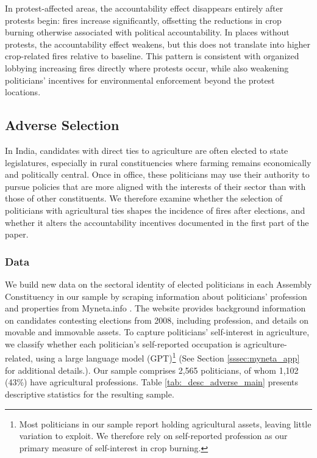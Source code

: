 \documentclass[12pt]{article}
\begin{document}
In protest-affected areas,  the accountability effect disappears entirely after protests begin: fires increase significantly, offsetting the reductions in crop burning otherwise associated with political accountability. In places without protests, the accountability effect weakens, but this does not translate into higher crop-related fires relative to baseline. This pattern is consistent with organized lobbying increasing fires directly where protests occur, while also weakening politicians’ incentives for environmental enforcement beyond the protest locations.


\FloatBarrier
 \subsection{Adverse Selection}

 
In India, candidates with direct ties to agriculture are often elected to state legislatures, especially in rural constituencies where farming remains economically and politically central. Once in office, these politicians may use their authority to pursue policies that are more aligned with the interests of their sector than with those of other constituents. We therefore examine whether the selection of politicians with agricultural ties shapes the incidence of fires after elections, and whether it alters the accountability incentives documented in the first part of the paper. 

 \subsubsection{Data}

 We build new data on the sectoral identity of elected politicians in each Assembly Constituency in our sample by scraping information about politicians' profession and properties from Myneta.info \citep{myneta}. The website provides background information on candidates contesting elections from 2008, including profession, and details on movable and immovable assets. To capture politicians' self-interest in agriculture, we classify whether each politician's self-reported occupation is agriculture-related, using a large language model (GPT)\footnote{Most politicians in our sample report holding agricultural assets, leaving little variation to exploit. We therefore rely on self-reported profession as our primary measure of self-interest in crop burning.} (See Section \ref{sssec:myneta_app} for additional details.).
Our sample comprises 2,565 politicians, of whom 1,102 (43\%) have agricultural professions.  %
Table \ref{tab:_desc_adverse_main} presents descriptive statistics for the resulting sample. 
\end{document}
